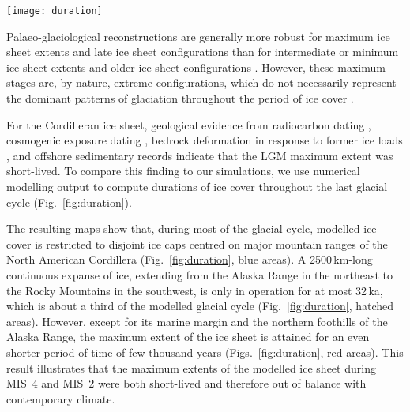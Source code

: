\documentclass[tc]{copernicus}
\begin{document}
\begin{figure*}
  \texttt{[image: duration]}
  \caption{Modelled duration of ice cover during the last 120\,ka.
           Note the irregular colour scale. A continuous ice cover spanning
           from the Alaska Range (AR) to the southern Coast Mountains (CM) and
           the Columbia and Rocky mountains (RM) exists for about 32\,ka in
           the GRIP simulation and 26\,ka in the EPICA simulation.
           The maximum extent of the ice sheet generally
           corresponds to relatively short durations of ice cover, but ice
           cover persists over the Skeena Mountains (SM) during most of the
           simulation. See Fig.~\ref{locmap} for a list of abbreviations.}
  \label{fig:duration}
\end{figure*}

Palaeo-glaciological reconstructions are generally more robust
for maximum ice sheet extents and late ice sheet configurations than for
intermediate or minimum ice sheet extents and older ice sheet configurations
\citep{Kleman.etal.2010}. However,
these maximum stages are, by nature, extreme configurations, which do not
necessarily represent the dominant patterns of glaciation throughout the period
of ice cover \citep{Porter.1989, Kleman.Stroeven.1997, Kleman.etal.2008,
Kleman.etal.2010}.

For the Cordilleran ice sheet, geological evidence from radiocarbon dating
    \citep{Clague.etal.1980, Clague.1985, Clague.1986, Porter.Swanson.1998,
           Menounos.etal.2008},
cosmogenic exposure dating
    \citep{Stroeven.etal.2010, Stroeven.etal.2014, Margold.etal.2014},
bedrock deformation in response to former ice loads
    \citep{Clague.James.2002, Clague.etal.2005},
and offshore sedimentary records
    \citep{Cosma.etal.2008, Davies.etal.2011}
indicate that the LGM maximum extent was short-lived. To compare this finding
to our simulations, we use numerical modelling output
to compute durations of ice cover throughout the last glacial
cycle (Fig.~\ref{fig:duration}).

The resulting maps show that, during most of the glacial cycle, modelled ice
cover is restricted to disjoint ice caps centred on major mountain ranges of
the North American Cordillera (Fig.~\ref{fig:duration}, blue areas). A
2500\,km-long continuous expanse of ice, extending from the Alaska Range in the
northeast to the Rocky Mountains in the southwest, is only in operation
for at most 32\,ka, which is about a third of the modelled glacial cycle
(Fig.~\ref{fig:duration}, hatched areas). However,
except for its marine margin and the northern foothills of the Alaska Range,
the maximum extent of the ice sheet is attained for an even shorter period
of time of few thousand years (Figs.~\ref{fig:duration}, red areas). This
result illustrates that the maximum extents of the modelled ice sheet during
MIS~4 and MIS~2 were both short-lived and therefore out of balance with
contemporary climate.
\end{document}

